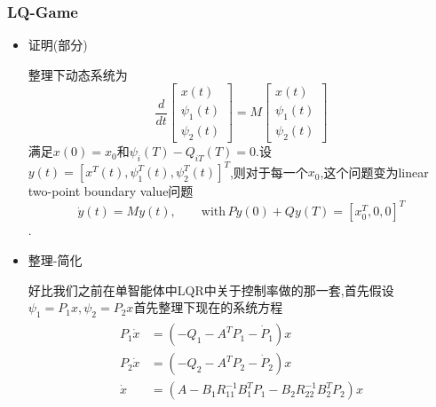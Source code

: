 \documentclass[UTF8, aspectratio=169, 9pt]{ctexbeamer}
\begin{document}
\begin{frame}
\frametitle{LQ-Game}
\begin{itemize}
\item 证明(部分)

整理下动态系统为
$$
\frac{d}{d t}\left[\begin{array}{c}
x(t) \\
\psi_{1}(t) \\
\psi_{2}(t)
\end{array}\right]=M\left[\begin{array}{c}
x(t) \\
\psi_{1}(t) \\
\psi_{2}(t)
\end{array}\right]
$$
满足$x(0)=x_0$和$\psi_i(T)-Q_{iT}(T)=0$.设$y(t)=[x^T(t), \psi^T_1(t), \psi^T_2(t) ]^T$,则对于每一个$x_0$,这个问题变为linear two-point boundary value问题
$$
\dot{y}(t) = M y(t), \qquad \text{with} \, P y(0) + Q y(T) = [x^T_0, 0, 0]^T
$$.

\item 整理-简化

好比我们之前在单智能体中LQR中关于控制率做的那一套,首先假设$\psi_1 = P_1 x, \psi_2 = P_2 x$首先整理下现在的系统方程
\begin{align*}
  \begin{split}
     P_1 \dot{x} & = (-Q_1 - A^T P_1 - \dot{P}_1 ) x \\
     P_2 \dot{x} & = (-Q_2 - A^T P_2 - \dot{P}_2 ) x \\
     \dot{x} & = (A  - B_1 R^{-1}_{11} B^T_1 P_1  - B_2 R^{-1}_{22} B^T_2 P_2 )x
  \end{split}
\end{align*}
\end{itemize}
\end{frame}
\end{document}
